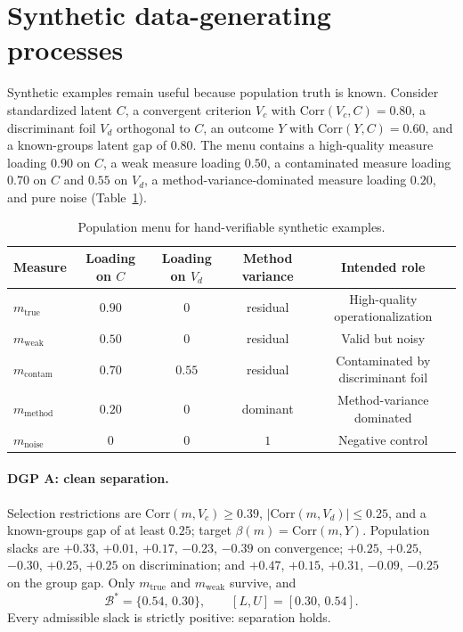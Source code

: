 \documentclass[10pt,letterpaper]{article}
\newcommand{\Bset}{\mathcal{B}}
\begin{document}
\section{Synthetic data-generating processes}
\label{app:dgp}

Synthetic examples remain useful because population truth is known.
Consider standardized latent $C$, a convergent criterion $V_c$ with $\mathrm{Corr}(V_c,C)=0.80$, a discriminant foil $V_d$ orthogonal to $C$, an outcome $Y$ with $\mathrm{Corr}(Y,C)=0.60$, and a known-groups latent gap of $0.80$.
The menu contains a high-quality measure loading $0.90$ on $C$, a weak measure loading $0.50$, a contaminated measure loading $0.70$ on $C$ and $0.55$ on $V_d$, a method-variance-dominated measure loading $0.20$, and pure noise (Table~\ref{tab:loadings}).

\begin{table}[ht]
\centering
\small
\caption{Population menu for hand-verifiable synthetic examples.}
\label{tab:loadings}
\begin{tabular}{@{}lcccc@{}}
\toprule
Measure & Loading on $C$ & Loading on $V_d$ & Method variance & Intended role \\
\midrule
$m_{\mathrm{true}}$   & $0.90$ & $0$    & residual & High-quality operationalization \\
$m_{\mathrm{weak}}$   & $0.50$ & $0$    & residual & Valid but noisy \\
$m_{\mathrm{contam}}$ & $0.70$ & $0.55$ & residual & Contaminated by discriminant foil \\
$m_{\mathrm{method}}$ & $0.20$ & $0$    & dominant & Method-variance dominated \\
$m_{\mathrm{noise}}$  & $0$    & $0$    & $1$     & Negative control \\
\bottomrule
\end{tabular}
\end{table}

\paragraph{DGP A: clean separation.}
Selection restrictions are $\mathrm{Corr}(m,V_c)\ge 0.39$, $|\mathrm{Corr}(m,V_d)|\le 0.25$, and a known-groups gap of at least $0.25$; target $\beta(m)=\mathrm{Corr}(m,Y)$.
Population slacks are $+0.33$, $+0.01$, $+0.17$, $-0.23$, $-0.39$ on convergence; $+0.25$, $+0.25$, $-0.30$, $+0.25$, $+0.25$ on discrimination; and $+0.47$, $+0.15$, $+0.31$, $-0.09$, $-0.25$ on the group gap.
Only $m_{\mathrm{true}}$ and $m_{\mathrm{weak}}$ survive, and
\[
\Bset^*=\bigl\{0.54,\,0.30\bigr\},\qquad [L,U]=[0.30,\,0.54].
\]
Every admissible slack is strictly positive: separation holds.
\end{document}
